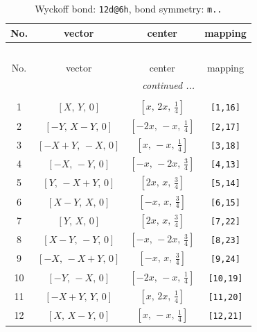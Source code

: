 \documentclass[fleqn,8pt]{jsarticle}
\begin{document}
\begin{longtable}{cccc}
\caption{Wyckoff bond: {\tt 12d@6h}, bond symmetry: {\tt m..}}
 \\
 \hline \hline
No. & vector & center & mapping \\ \hline \endfirsthead

\multicolumn{3}{l}{\tablename\ \thetable{}} \\
 \hline \hline
No. & vector & center & mapping \\ \hline \endhead

 \hline \hline
\multicolumn{3}{r}{\footnotesize\it continued ...} \\ \endfoot

 \hline \hline
\multicolumn{3}{r}{} \\ \endlastfoot

1 & $\left[ X,\, Y,\, 0 \right]$ & $\left[ x,\, 2 x,\, \frac{1}{4} \right]$ & {\tt [1,16]} \\ \hline
2 & $\left[ - Y,\, X - Y,\, 0 \right]$ & $\left[ - 2 x,\, - x,\, \frac{1}{4} \right]$ & {\tt [2,17]} \\ \hline
3 & $\left[ - X + Y,\, - X,\, 0 \right]$ & $\left[ x,\, - x,\, \frac{1}{4} \right]$ & {\tt [3,18]} \\ \hline
4 & $\left[ - X,\, - Y,\, 0 \right]$ & $\left[ - x,\, - 2 x,\, \frac{3}{4} \right]$ & {\tt [4,13]} \\ \hline
5 & $\left[ Y,\, - X + Y,\, 0 \right]$ & $\left[ 2 x,\, x,\, \frac{3}{4} \right]$ & {\tt [5,14]} \\ \hline
6 & $\left[ X - Y,\, X,\, 0 \right]$ & $\left[ - x,\, x,\, \frac{3}{4} \right]$ & {\tt [6,15]} \\ \hline
7 & $\left[ Y,\, X,\, 0 \right]$ & $\left[ 2 x,\, x,\, \frac{3}{4} \right]$ & {\tt [7,22]} \\ \hline
8 & $\left[ X - Y,\, - Y,\, 0 \right]$ & $\left[ - x,\, - 2 x,\, \frac{3}{4} \right]$ & {\tt [8,23]} \\ \hline
9 & $\left[ - X,\, - X + Y,\, 0 \right]$ & $\left[ - x,\, x,\, \frac{3}{4} \right]$ & {\tt [9,24]} \\ \hline
10 & $\left[ - Y,\, - X,\, 0 \right]$ & $\left[ - 2 x,\, - x,\, \frac{1}{4} \right]$ & {\tt [10,19]} \\ \hline
11 & $\left[ - X + Y,\, Y,\, 0 \right]$ & $\left[ x,\, 2 x,\, \frac{1}{4} \right]$ & {\tt [11,20]} \\ \hline
12 & $\left[ X,\, X - Y,\, 0 \right]$ & $\left[ x,\, - x,\, \frac{1}{4} \right]$ & {\tt [12,21]} \\
\end{longtable}
\end{document}
